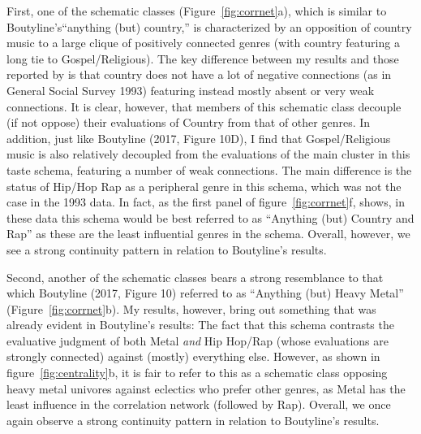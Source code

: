 \documentclass[preprint, authoryear,11pt, 3p]{elsarticle}
\begin{document}
First, one of the schematic classes (Figure~\ref{fig:corrnet}a), which is similar to Boutyline's``anything (but) country,'' is characterized by an opposition of country music to a large clique of positively connected genres (with country featuring a long tie to Gospel/Religious). The key difference between my results and those reported by \citet{boutyline2017improving} is that country does not have a lot of negative connections (as in General Social Survey 1993) featuring instead mostly absent or very weak connections. It is clear, however, that members of this schematic class decouple (if not oppose) their evaluations of Country from that of other genres. In addition, just like Boutyline (2017, Figure 10D), I find that Gospel/Religious music is also relatively decoupled from the evaluations of the main cluster in this taste schema, featuring a number of weak connections. The main difference is the status of Hip/Hop Rap as a peripheral genre in this schema, which was not the case in the 1993 data. In fact, as the first panel of figure~\ref{fig:corrnet}f, shows, in these data this schema would be best referred to as ``Anything (but) Country and Rap'' as these are the least influential genres in the schema. Overall, however, we see a strong continuity pattern in relation to Boutyline's results.  

Second, another of the schematic classes bears a strong resemblance to that which Boutyline (2017, Figure 10) referred to as ``Anything (but) Heavy Metal'' (Figure~\ref{fig:corrnet}b). My results, however, bring out something that was already evident in Boutyline's results: The fact that this schema contrasts the evaluative judgment of both Metal {\em and} Hip Hop/Rap (whose evaluations are strongly connected) against (mostly) everything else. However, as shown in figure~\ref{fig:centrality}b, it is fair to refer to this as a schematic class opposing heavy metal univores against eclectics who prefer other genres, as Metal has the least influence in the correlation network (followed by Rap). Overall, we once again observe a strong continuity pattern in relation to Boutyline's results.  
\end{document}
